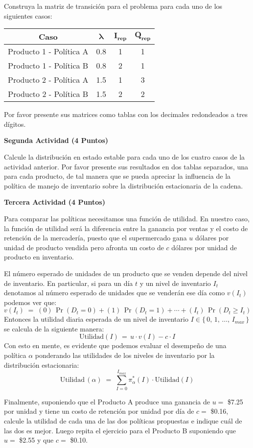 \documentclass[ a4paper, twoside, 11pt]{article}
\begin{document}
\begin{problem}
Construya la matriz de transici\'on para el problema para cada uno de los siguientes casos: 
\begin{table}[htb]
\centering
\begin{tabular}{|c|c|c|c|}
\hline
\textbf{Caso}           & $\bm{\lambda}$ & $\bm{I_{rep}}$ & $\bm{Q_{rep}}$ \\ \hline
Producto 1 - Pol\'itica A & 0.8 & 1  & 1                  \\ \hline
Producto 1 - Pol\'itica B & 0.8 & 2  & 1                  \\ \hline
Producto 2 - Pol\'itica A & 1.5 & 1  & 3                  \\ \hline
Producto 2 - Pol\'itica B & 1.5 & 2  & 2                  \\ \hline
\end{tabular}
\end{table}

Por favor presente sus matrices como tablas con los decimales redondeados a tres d\'igitos. 

\textbf{Segunda Actividad (4 Puntos)}

Calcule la distribuci\'on en estado estable para cada uno de los cuatro casos de la actividad anterior. Por favor presente sus resultados en dos tablas separados, una para cada producto, de tal manera que se pueda apreciar la influencia de la pol\'itica de manejo de inventario sobre la distribuci\'on estacionaria de la cadena. 

\textbf{Tercera Actividad (4 Puntos)}

Para comparar las pol\'iticas necesitamos una funci\'on de utilidad. En nuestro caso, la funci\'on de utilidad ser\'a la diferencia entre la ganancia por ventas y el costo de retenci\'on de la mercader\'ia, puesto que el supermercado gana $u$ d\'olares por unidad de producto vendida pero afronta un costo de $c$ d\'olares por unidad de producto en inventario. 

El n\'umero esperado de unidades de un producto que se venden depende del nivel de inventario. En particular, si para un d\'ia $t$ y un nivel de inventario $I_t$ denotamos al n\'umero esperado de unidades que se vender\'an ese d\'ia como $v(I_t)$ podemos ver que: 
\[
v(I_t) \; = \; (0) \, \Pr( D_t = 0 ) + (1) \, \Pr( D_t = 1 ) + \cdots + (I_t) \, \Pr( D_t \geq I_t )
\]
Entonces la utilidad diaria esperada de un nivel de inventario $I \in \{ \, 0, \, 1, \, \dots, \, I_{max} \, \}$ se calcula de la siguiente manera: 
\[
\text{Utilidad}(I) \, = \, u \cdot v(I) - c \cdot I
\]
Con esto en mente, es evidente que podemos evaluar el desempe\~no de una pol\'itica $\alpha$ ponderando las utilidades de los niveles de inventario por la distribuci\'on estacionaria: 
\[
\text{Utilidad} \, (\alpha) \; = \; 
\sum_{ I = 0 }^{I_{max}} \pi^*_{\alpha}(I) \cdot \text{Utilidad}(I)
\]

Finalmente, suponiendo que el Producto A produce una ganancia de $u =$ \$7.25 por unidad y tiene un costo de retenci\'on por unidad por d\'ia de $c =$ \$0.16, calcule la utilidad de cada una de las dos pol\'iticas propuestas e indique cu\'al de las dos es mejor. Luego repita el ejercicio para el Producto B suponiendo que $u =$ \$2.55 y que $c =$ \$0.10. 

\end{problem}
\end{document}
